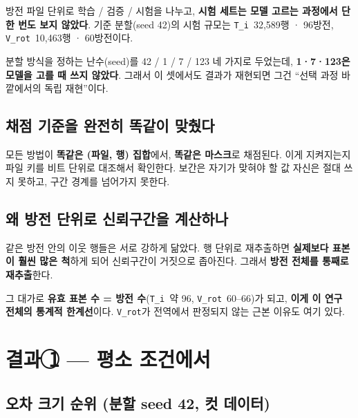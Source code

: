 \documentclass[10pt]{article}
\newcommand{\Ti}{\texttt{T\_i}}
\newcommand{\Vrot}{\texttt{V\_rot}}
\begin{document}
방전 파일 단위로 학습 / 검증 / 시험을 나누고, \textbf{시험 세트는 모델 고르는 과정에서 단
한 번도 보지 않았다}. 기준 분할(seed 42)의 시험 규모는 \Ti\ 32{,}589행 · 96방전,
\Vrot\ 10{,}463행 · 60방전이다.

분할 방식을 정하는 난수(seed)를 42 / 1 / 7 / 123 네 가지로 두었는데, \textbf{1·7·123은
모델을 고를 때 쓰지 않았다}. 그래서 이 셋에서도 결과가 재현되면 그건 ``선택 과정 바깥에서의
독립 재현''이다.

\subsection{채점 기준을 완전히 똑같이 맞췄다}

모든 방법이 \textbf{똑같은 (파일, 행) 집합}에서, \textbf{똑같은 마스크}로 채점된다. 이게
지켜지는지 파일 키를 비트 단위로 대조해서 확인한다. 보간은 자기가 맞혀야 할 값 자신은 절대
쓰지 못하고, 구간 경계를 넘어가지 못한다.

\subsection{왜 방전 단위로 신뢰구간을 계산하나}

같은 방전 안의 이웃 행들은 서로 강하게 닮았다. 행 단위로 재추출하면 \textbf{실제보다 표본이
훨씬 많은 척}하게 되어 신뢰구간이 거짓으로 좁아진다. 그래서 \textbf{방전 전체를 통째로
재추출}한다.

그 대가로 \textbf{유효 표본 수 = 방전 수}(\Ti\ 약 96, \Vrot\ 60--66)가 되고, \textbf{이게
이 연구 전체의 통계적 한계선}이다. \Vrot 가 전역에서 판정되지 않는 근본 이유도 여기 있다.

\section{결과 \textcircled{1} --- 평소 조건에서}

\subsection{오차 크기 순위 (분할 seed 42, 컷 데이터)}
\end{document}
